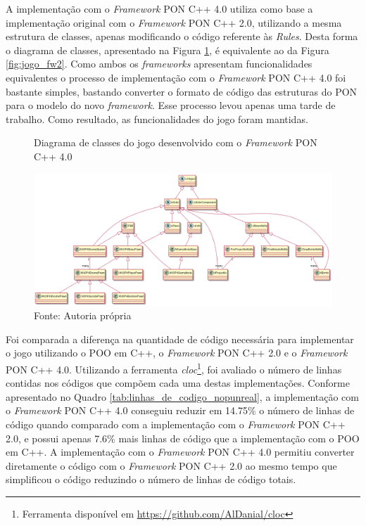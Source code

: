 A implementação com o \textit{Framework} PON C++ 4.0 utiliza
como base a implementação original com o \textit{Framework} PON C++ 2.0,
utilizando a mesma estrutura de classes, apenas modificando o código referente
às \textit{Rules}. Desta forma o diagrama de classes, apresentado na Figura
\ref{fig:jogo_fw4}, é equivalente ao da Figura \ref{fig:jogo_fw2}. 
Como ambos os \textit{frameworks} apresentam funcionalidades equivalentes o
processo de implementação com o \textit{Framework} PON C++ 4.0 foi bastante
simples, bastando converter o formato de código das estruturas do PON para o
modelo do novo \textit{framework}. Esse processo levou apenas uma tarde de
trabalho. Como resultado, as funcionalidades do jogo foram mantidas.

\begin{figure}[!htb]
\centering
\caption{Diagrama de classes do jogo desenvolvido com o \textit{Framework} PON
C++ 4.0 }
\includegraphics[width=\textwidth]{../out/diagrams/class_diagram_nop4/NOP4Unreal.png}
\smallskip
\caption*{Fonte: Autoria própria}
\label{fig:jogo_fw4}
\end{figure}

Foi comparada a diferença na quantidade de código necessária para implementar o
jogo utilizando o POO em C++, o \textit{Framework} PON C++ 2.0 e o
\textit{Framework} PON C++ 4.0. Utilizando a ferramenta
\textit{cloc}\footnote{Ferramenta disponível em
\url{https://github.com/AlDanial/cloc}}, foi avaliado o número de linhas
contidas nos códigos que compõem cada uma destas implementações. Conforme
apresentado no Quadro \ref{tab:linhas_de_codigo_nopunreal}, a implementação com
o \textit{Framework} PON C++ 4.0 conseguiu reduzir em 14.75\% o número de linhas
de código quando comparado com a implementação com o \textit{Framework} PON C++
2.0, e possui apenas 7.6\% mais linhas de código que a implementação com o POO
em C++. A implementação com o \textit{Framework} PON C++ 4.0 permitiu converter
diretamente o código com o \textit{Framework} PON C++ 2.0 ao mesmo tempo que
simplificou o código reduzindo o número de linhas de código totais.

